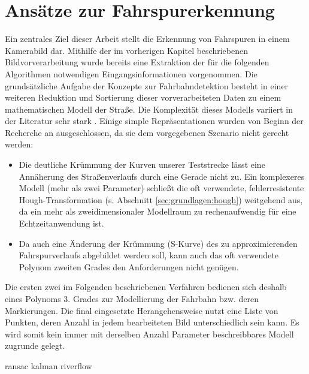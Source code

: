 \chapter{Ansätze zur Fahrspurerkennung \dcsecondauthorshort}
\label{cha:fahrspurerkennung}
Ein zentrales Ziel dieser Arbeit stellt die Erkennung von Fahrspuren in einem Kamerabild dar. Mithilfe der im vorherigen Kapitel beschriebenen Bildvorverarbeitung wurde bereits eine Extraktion der für die folgenden Algorithmen notwendigen Eingangsinformationen vorgenommen. Die grundsätzliche Aufgabe der Konzepte zur Fahrbahndetektion besteht in einer weiteren Reduktion und Sortierung dieser vorverarbeiteten Daten zu einem mathematischen Modell der Straße. Die Komplexität dieses Modells variiert in der Literatur sehr stark \autocite{naroteReviewRecentAdvances2018}. Einige simple Repräsentationen wurden von Beginn der Recherche an ausgeschlossen, da sie dem vorgegebenen Szenario nicht gerecht werden: 
\begin{itemize}
\item Die deutliche Krümmung der Kurven unserer Teststrecke lässt eine Annäherung des Straßenverlaufs durch eine Gerade nicht zu. Ein komplexeres Modell (mehr als zwei Parameter) schließt die oft verwendete, fehlerresistente Hough-Transformation (s. Abschnitt \ref{sec:grundlagen:hough}) weitgehend aus, da ein mehr als zweidimensionaler Modellraum zu rechenaufwendig für eine Echtzeitanwendung ist. 
\item Da auch eine Änderung der Krümmung (S-Kurve) des zu approximierenden Fahrspurverlaufs abgebildet werden soll, kann auch das oft verwendete Polynom zweiten Grades den Anforderungen nicht genügen. 
\end{itemize}
Die ersten zwei im Folgenden beschriebenen Verfahren bedienen sich deshalb eines Polynoms 3. Grades zur Modellierung der Fahrbahn bzw. deren Markierungen. Die final eingesetzte Herangehensweise nutzt eine Liste von Punkten, deren Anzahl in jedem bearbeiteten Bild unterschiedlich sein kann. Es wird somit kein immer mit derselben Anzahl Parameter beschreibbares Modell zugrunde gelegt. 

{ransac}
{kalman}
{riverflow}
